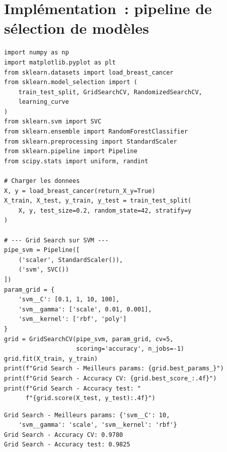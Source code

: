 \section{Impl\'ementation~: pipeline de s\'election de mod\`eles}
\label{sec:implementation-selection}

\begin{codeblock}[title=\textbf{Comparaison Grid Search, Random Search et courbes d'apprentissage}]
\begin{verbatim}
import numpy as np
import matplotlib.pyplot as plt
from sklearn.datasets import load_breast_cancer
from sklearn.model_selection import (
    train_test_split, GridSearchCV, RandomizedSearchCV,
    learning_curve
)
from sklearn.svm import SVC
from sklearn.ensemble import RandomForestClassifier
from sklearn.preprocessing import StandardScaler
from sklearn.pipeline import Pipeline
from scipy.stats import uniform, randint

# Charger les donnees
X, y = load_breast_cancer(return_X_y=True)
X_train, X_test, y_train, y_test = train_test_split(
    X, y, test_size=0.2, random_state=42, stratify=y
)

# --- Grid Search sur SVM ---
pipe_svm = Pipeline([
    ('scaler', StandardScaler()),
    ('svm', SVC())
])
param_grid = {
    'svm__C': [0.1, 1, 10, 100],
    'svm__gamma': ['scale', 0.01, 0.001],
    'svm__kernel': ['rbf', 'poly']
}
grid = GridSearchCV(pipe_svm, param_grid, cv=5,
                    scoring='accuracy', n_jobs=-1)
grid.fit(X_train, y_train)
print(f"Grid Search - Meilleurs params: {grid.best_params_}")
print(f"Grid Search - Accuracy CV: {grid.best_score_:.4f}")
print(f"Grid Search - Accuracy test: "
      f"{grid.score(X_test, y_test):.4f}")
\end{verbatim}
\end{codeblock}

\begin{codeoutput}
\begin{verbatim}
Grid Search - Meilleurs params: {'svm__C': 10,
    'svm__gamma': 'scale', 'svm__kernel': 'rbf'}
Grid Search - Accuracy CV: 0.9780
Grid Search - Accuracy test: 0.9825
\end{verbatim}
\end{codeoutput}

